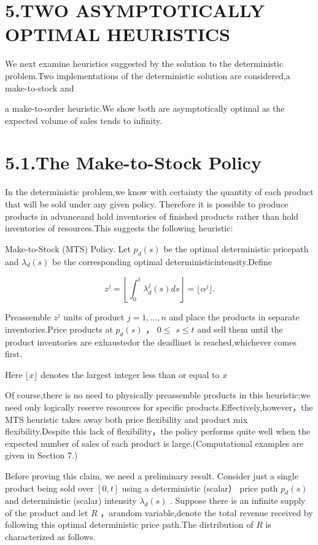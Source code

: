 \section{5.TWO ASYMPTOTICALLY OPTIMAL
HEURISTICS}\label{two-asymptotically-optimal-heuristics}

We next examine heuristics suggested by the solution to the
deterministic problem.Two implementations of the deterministic solution
are considered,a make-to-stock and

a make-to-order heuristic.We show both are asymptotically optimal as the
expected volume of sales tends to infinity.

\section{5.1.The Make-to-Stock Policy}\label{the-make-to-stock-policy}

In the deterministic problem,we know with certainty the quantity of each
product that will be sold under any given policy. Therefore it is
possible to produce products in advanceand hold inventories of finished
products rather than hold inventories of resources.This suggests the
following heuristic:

Make-to-Stock (MTS) Policy. Let \(p _ { d } ( s )\) be the optimal
deterministic pricepath and \(\lambda _ { d } ( s )\) be the
corresponding optimal deterministicintensity.Define

\[
z ^ { j } = \left\lfloor \int _ { 0 } ^ { t } \lambda _ { d } ^ { j } ( s ) d s \right\rfloor = \lfloor \alpha ^ { j } \rfloor .
\]

Preassemble \(z ^ { j }\) units of product \(j = 1 , \ldots , n\) and
place the products in separate inventories.Price products at
\(p _ { d } ( s )\) ， \(0 \leqslant\) \(s \leqslant t\) and sell them
until the product inventories are exhaustedor the deadlinet is
reached,whichever comes first.

Here \(\lfloor x \rfloor\) denotes the largest integer less than or
equal to \(x\)

Of course,there is no need to physically preassemble products in this
heuristic;we need only logically reserve resources for specific
products.Effectively,however，the MTS heuristic takes away both price
flexibility and product mix flexibility.Despite this lack of
flexibility，the policy performs quite well when the expected number of
sales of each product is large.(Computational examples are given in
Section 7.)

Before proving this claim, we need a preliminary result. Consider just a
single product being sold over \([ 0 , t ]\) using a deterministic
(scalar） price path \(p _ { d } ( s )\) and deterministic (scalar)
intensity \(\lambda _ { d } ( s )\) . Suppose there is an infinite
supply of the product and let \(R\) ，arandom variable,denote the total
revenue received by following this optimal deterministic price path.The
distribution of \(R\) is characterized as follows.


